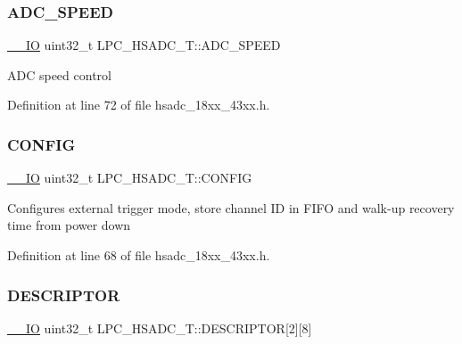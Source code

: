 \subsubsection{\texorpdfstring{A\+D\+C\+\_\+\+S\+P\+E\+ED}{ADC\_SPEED}}
{\footnotesize\ttfamily \hyperlink{core__sc300_8h_aec43007d9998a0a0e01faede4133d6be}{\+\_\+\+\_\+\+IO} uint32\+\_\+t L\+P\+C\+\_\+\+H\+S\+A\+D\+C\+\_\+\+T\+::\+A\+D\+C\+\_\+\+S\+P\+E\+ED}

A\+DC speed control 

Definition at line 72 of file hsadc\+\_\+18xx\+\_\+43xx.\+h.

\mbox{\label{struct_l_p_c___h_s_a_d_c___t_a6334e6984184e3fbe980f1a9a1bb482d}} 
\subsubsection{\texorpdfstring{C\+O\+N\+F\+IG}{CONFIG}}
{\footnotesize\ttfamily \hyperlink{core__sc300_8h_aec43007d9998a0a0e01faede4133d6be}{\+\_\+\+\_\+\+IO} uint32\+\_\+t L\+P\+C\+\_\+\+H\+S\+A\+D\+C\+\_\+\+T\+::\+C\+O\+N\+F\+IG}

Configures external trigger mode, store channel ID in F\+I\+FO and walk-\/up recovery time from power down 

Definition at line 68 of file hsadc\+\_\+18xx\+\_\+43xx.\+h.

\mbox{\label{struct_l_p_c___h_s_a_d_c___t_acf8c80fd828a7907acbbc3d2343f6ad9}} 
\subsubsection{\texorpdfstring{D\+E\+S\+C\+R\+I\+P\+T\+OR}{DESCRIPTOR}}
{\footnotesize\ttfamily \hyperlink{core__sc300_8h_aec43007d9998a0a0e01faede4133d6be}{\+\_\+\+\_\+\+IO} uint32\+\_\+t L\+P\+C\+\_\+\+H\+S\+A\+D\+C\+\_\+\+T\+::\+D\+E\+S\+C\+R\+I\+P\+T\+OR\mbox{[}2\mbox{]}\mbox{[}8\mbox{]}}

